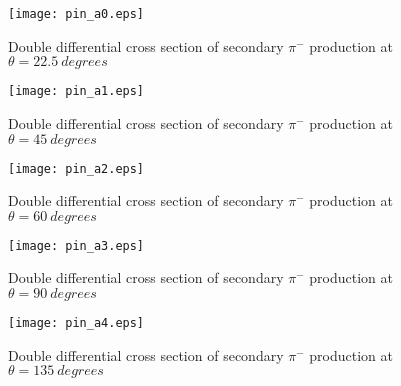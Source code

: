 \documentclass[12pt]{article}
\begin{document}
\begin{figure}[htbp]
\caption{Double differential cross section of secondary $\pi^-$ production at $\theta = 22.5~degrees$}
\label{figpin0} 
\centerline{\texttt{[image: pin\_a0.eps]}}
\end{figure}


\begin{figure}[htbp]
\caption{Double differential cross section of secondary $\pi^-$ production at $\theta = 45~degrees$}
\label{figpin1} 
\centerline{\texttt{[image: pin\_a1.eps]}}
\end{figure}

\begin{figure}[htbp]
\caption{Double differential cross section of secondary $\pi^-$ production at $\theta = 60~degrees$}
\label{figpin2} 
\centerline{\texttt{[image: pin\_a2.eps]}}
\end{figure}

\begin{figure}[htbp]
\caption{Double differential cross section of secondary $\pi^-$ production at $\theta = 90~degrees$}
\label{figpin3} 
\centerline{\texttt{[image: pin\_a3.eps]}}
\end{figure}

\begin{figure}[htbp]
\caption{Double differential cross section of secondary $\pi^-$ production at $\theta = 135~degrees$}
\label{figpin4} 
\centerline{\texttt{[image: pin\_a4.eps]}}
\end{figure}
\end{document}
